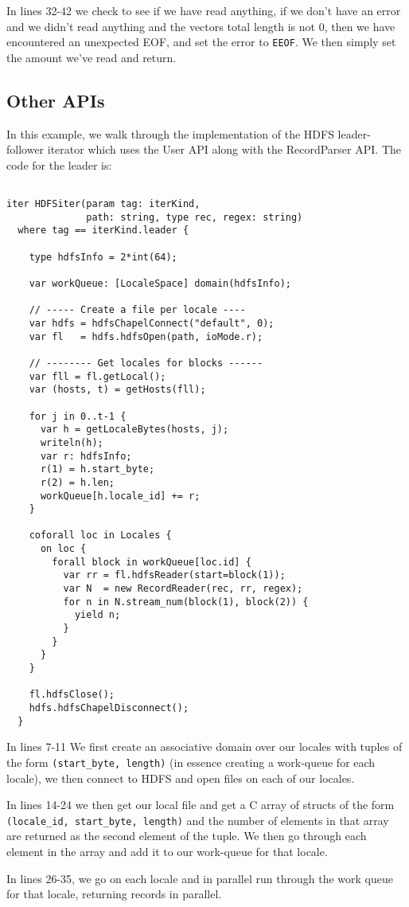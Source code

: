 In lines 32-42 we check to see if we have read anything, if we don't have an error
and we didn't read anything and the vectors total length is not 0, then we have
encountered an unexpected EOF, and set the error to {\tt EEOF}. We then simply set the
amount we've read and return.

\subsection{Other APIs}

In this example, we walk through the implementation of the HDFS leader-follower
iterator which uses the User API along with the RecordParser API. The code for the
leader is:
\begin{lstlisting}

iter HDFSiter(param tag: iterKind, 
              path: string, type rec, regex: string)
  where tag == iterKind.leader {

    type hdfsInfo = 2*int(64);

    var workQueue: [LocaleSpace] domain(hdfsInfo);

    // ----- Create a file per locale ----
    var hdfs = hdfsChapelConnect("default", 0);
    var fl   = hdfs.hdfsOpen(path, ioMode.r);

    // -------- Get locales for blocks ------
    var fll = fl.getLocal();
    var (hosts, t) = getHosts(fll);

    for j in 0..t-1 {
      var h = getLocaleBytes(hosts, j);
      writeln(h);
      var r: hdfsInfo;
      r(1) = h.start_byte;
      r(2) = h.len;
      workQueue[h.locale_id] += r;
    }

    coforall loc in Locales {
      on loc {
        forall block in workQueue[loc.id] {
          var rr = fl.hdfsReader(start=block(1));
          var N  = new RecordReader(rec, rr, regex);
          for n in N.stream_num(block(1), block(2)) {
            yield n;
          }
        }
      }
    }

    fl.hdfsClose();
    hdfs.hdfsChapelDisconnect();
  }
\end{lstlisting}

In lines 7-11 We first create an associative domain over our locales with tuples of
the form {\tt (start\_byte, length)} (in essence creating a work-queue for each locale),
we then connect to HDFS and open files on each of our locales.

In lines 14-24 we then get our local file and get a C array of structs of
the form {\tt (locale\_id, start\_byte, length)} and the number of elements in that array are returned as the
second element of the tuple. We then go through each element in the array and add it
to our work-queue for that locale.

In lines 26-35, we go on each locale and in parallel run through the work queue for that
locale, returning records in parallel.




